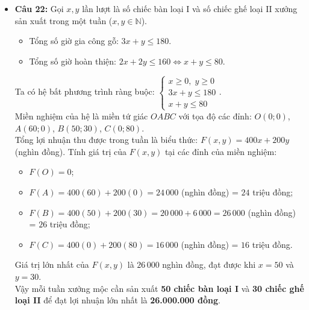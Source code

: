 \documentclass[12pt,a4paper]{article}
\begin{document}
\begin{itemize}[leftmargin=0.6cm, itemsep=2pt, topsep=1pt]
    \item \textbf{Câu 22:}
    Gọi $x, y$ lần lượt là số chiếc bàn loại I và số chiếc ghế loại II xưởng sản xuất trong một tuần ($x, y \in \mathbb{N}$).
    \begin{itemize}[itemsep=1pt]
        \item Tổng số giờ gia công gỗ: $3x + y \le 180$.
        \item Tổng số giờ hoàn thiện: $2x + 2y \le 160 \iff x + y \le 80$.
    \end{itemize}
    Ta có hệ bất phương trình ràng buộc:
    $\begin{cases} x \ge 0,\; y \ge 0 \\ 3x + y \le 180 \\ x + y \le 80 \end{cases}$.\\
    Miền nghiệm của hệ là miền tứ giác $OABC$ với tọa độ các đỉnh:
    $O(0; 0)$, $A(60; 0)$, $B(50; 30)$, $C(0; 80)$.\\
    Tổng lợi nhuận thu được trong tuần là biểu thức: $F(x, y) = 400x + 200y$ (nghìn đồng).
    Tính giá trị của $F(x, y)$ tại các đỉnh của miền nghiệm:
    \begin{itemize}[itemsep=1pt]
        \item $F(O) = 0$;
        \item $F(A) = 400(60) + 200(0) = 24\,000$ (nghìn đồng) = $24$ triệu đồng;
        \item $F(B) = 400(50) + 200(30) = 20\,000 + 6\,000 = 26\,000$ (nghìn đồng) = $26$ triệu đồng;
        \item $F(C) = 400(0) + 200(80) = 16\,000$ (nghìn đồng) = $16$ triệu đồng.
    \end{itemize}
    Giá trị lớn nhất của $F(x, y)$ là $26\,000$ nghìn đồng, đạt được khi $x = 50$ và $y = 30$.\\
    Vậy mỗi tuần xưởng mộc cần sản xuất \textbf{50 chiếc bàn loại I} và \textbf{30 chiếc ghế loại II} để đạt lợi nhuận lớn nhất là \textbf{26.000.000 đồng}.
\end{itemize}
\end{document}
